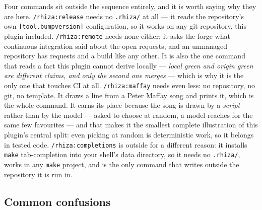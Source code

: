 \documentclass[11pt,a4paper]{article}
\newcommand{\cmd}[1]{\texttt{/rhiza:#1}}
\newcommand{\file}[1]{\texttt{#1}}
\begin{document}
\medskip
\noindent
Four commands sit outside the sequence entirely, and it is worth saying why they are
here. \cmd{release} needs no \file{.rhiza/} at all --- it reads the repository's own
\texttt{[tool.bumpversion]} configuration, so it works on any git repository, this plugin
included. \cmd{remote} needs none either: it asks the forge what continuous integration
said about the open requests, and an unmanaged repository has requests and a build like
any other. It is also the one command that reads a fact this plugin cannot derive
locally --- \emph{local green and origin green are different claims, and only the second
one merges} --- which is why it is the only one that touches CI at all.
\cmd{maffay} needs even less: no repository, no git, no template. It draws a
line from a Peter Maffay song and prints it, which is the whole command. It earns its
place because the song is drawn by a \emph{script} rather than by the model --- asked to
choose at random, a model reaches for the same few favourites --- and that makes it the
smallest complete illustration of this plugin's central split: even picking at random is
deterministic work, so it belongs in tested code. \cmd{completions} is outside for a
different reason: it installs \texttt{make} tab-completion into your shell's data
directory, so it needs no \file{.rhiza/}, works in any \texttt{make} project, and is the
only command that writes outside the repository it is run in.

\subsection*{Common confusions}
\end{document}
